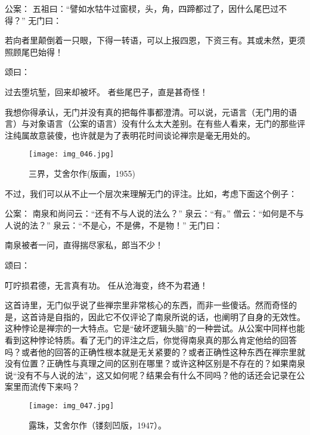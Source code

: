 \begin{zenkoan}
公案：
五祖曰：“譬如水牯牛过窗棂，头，角，四蹄都过了，因什么尾巴过不得？”
无门曰：
\begin{zenkoan}
若向者里颠倒着一只眼，下得一转语，可以上报四恩，下资三有。其或未然，更须照顾尾巴始得！
\end{zenkoan}
颂曰：
\begin{zenkoan}
过去堕坑堑，回来却被坏。
者些尾巴子，直是甚奇怪！
\end{zenkoan}
\end{zenkoan}

我想你得承认，无门并没有真的把每件事都澄清。可以说，元语言（无门用的语言）与对象语言（公案的语言）没有什么太大差别。在有些人看来，无门的那些评注纯属故意装傻，也许就是为了表明花时间谈论禅宗是毫无用处的。

\begin{figure}
\texttt{[image: img\_046.jpg]}
\caption[三界，艾舍尔作。]
  {三界，艾舍尔作(版画，1955)}
\end{figure}

不过，我们可以从不止一个层次来理解无门的评注。比如，考虑下面这个例子：

\begin{zenkoan}
公案：
南泉和尚问云：“还有不与人说的法么？”
泉云：“有。”
僧云：“如何是不与人说的法？”
泉云：“不是心，不是佛，不是物！”
无门曰：
\begin{zenkoan}
南泉被者一问，直得揣尽家私，郎当不少！
\end{zenkoan}
颂曰：
\begin{zenkoan}
叮咛损君德，无言真有功。
任从沧海变，终不为君通！
\end{zenkoan}
\end{zenkoan}

这首诗里，无门似乎说了些禅宗里非常核心的东西，而非一些傻话。然而奇怪的是，这首诗是自指的，因此它不仅评论了南泉所说的话，也阐明了自身的无效性。这种悖论是禅宗的一大特点。它是“破坏逻辑头脑”的一种尝试。从公案中同样也能看到这种悖论特质。看了无门的评注之后，你觉得南泉真的那么肯定他给的回答吗？或者他的回答的正确性根本就是无关紧要的？或者正确性这种东西在禅宗里就没有位置？正确性与真理之间的区别在哪里？或许这种区别是不存在的？如果南泉说“没有不与人说的法”，这又如何呢？结果会有什么不同吗？他的话还会记录在公案里而流传下来吗？

\begin{figure}
\texttt{[image: img\_047.jpg]}
\caption[露珠，艾舍尔作。]
  {露珠，艾舍尔作（镂刻凹版，1947）。}
\end{figure}

